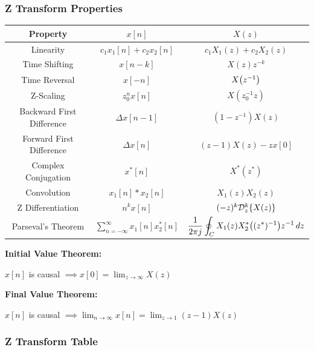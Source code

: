 \documentclass[11pt]{article}
\begin{document}
  \subsubsection{Z Transform Properties}

  \bgroup
  \renewcommand{\arraystretch}{2.1}
  \setlength{\tabcolsep}{0.7cm}
  \large\begin{tabular}{c|c|c}
    Property & \(x[n]\) & \(X(z)\) \\
    \hline
    Linearity & \(c_1x_1[n] + c_2x_2[n]\) & \(c_1X_1(z) + c_2X_2(z)\) \\
    Time Shifting & \(x[n - k]\) & \(X(z)z^{-k}\) \\
    Time Reversal & \(x[-n]\) & \(X{\left( z^{-1} \right)}\) \\
    Z-Scaling & \(z_0^nx[n]\) & \(X(z_0^{-1}z)\) \\
    Backward First Difference & \(\Delta x[n - 1]\) & \((1 - z^{-1})X(z)\) \\
    Forward First Difference & \(\Delta x[n]\) & \((z - 1)X(z) - zx[0]\) \\
    Complex Conjugation & \(x^*[n]\) & \(X^*(z^*)\) \\
    Convolution & \(x_1[n] * x_2[n]\) & \(X_1(z)X_2(z)\) \\
    Z Differentiation & \(n^kx[n]\) & \((-z)^k \mathcal{D}_z^k{\left\{ X(z) \right\}}\) \\
    Parseval's Theorem & \(\displaystyle\sum_{n = -\infty}^\infty x_1[n]x_2^*[n]\) &
    \(\displaystyle \dfrac{1}{2\pi j} \oint_C X_1(z)X_2^*{\left( (z^*)^{-1} \right)}z^{-1}\, dz\) \\
  \end{tabular}

  \textbf{Initial Value Theorem:}

  \(x[n]\) is causal \(\implies x[0] = \displaystyle \lim_{z \to \infty} X(z)\)

  \textbf{Final Value Theorem:}

  \(x[n]\) is causal \(\implies \displaystyle \lim_{n \to \infty} x[n] =\lim_{z \to 1} (z - 1)X(z)\)

  \pagebreak

  \subsubsection{Z Transform Table}
\end{document}
